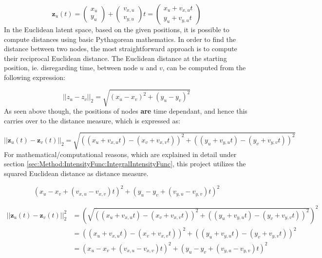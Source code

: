 \begin{equation}
    \textbf{z}_u(t) = \begin{pmatrix}
    x_u\\
    y_u
    \end{pmatrix}
    +
    \begin{pmatrix}
    v_{x,u}\\
    v_{y,u}
    \end{pmatrix}
    t
    = 
    \begin{pmatrix}
    x_u + v_{x,u}t\\
    y_u + v_{y,u}t
    \end{pmatrix}
\end{equation}
In the Euclidean latent space, based on the given positions, it is possible to compute distances using basic Pythagorean mathematics. 
In order to find the distance between two nodes, the most straightforward approach is to compute their reciprocal Euclidean distance.
The Euclidean distance at the starting position, ie. disregarding time, between node $u$ and $v$, can be computed from the following expression:

\begin{equation}
    ||z_u - z_v||_2
    = 
    \sqrt{(x_u - x_v)^2 + (y_u - y_v)^2}
\end{equation}
As seen above though, the positions of nodes \textbf{are} time dependant, and hence this carries over to the distance measure, which is expressed as:

\begin{equation}
    ||\textbf{z}_u(t) - \textbf{z}_v(t)||_2
    = 
    \sqrt{((x_u + v_{x,u}t) - (x_v + v_{x,v}t))^2 + ((y_u + v_{y,u}t) - (y_v + v_{y,v}t))^2}
\end{equation}
For mathematical/computational reasons, which are explained in detail under section \ref{sec:Method:IntensityFunc:IntegralIntensityFunc}, this project utilizes the squared Euclidean distance as distance measure.

\begin{equation}
    (x_u - x_v + (v_{x,u} - v_{x,v})t)^2 + (y_u - y_v + ( v_{y,u} - v_{y,v})t)^2
\end{equation}

\begin{align} 
||\textbf{z}_u(t) - \textbf{z}_v(t)||_2^2
&= 
\left(\sqrt{((x_u + v_{x,u}t) - (x_v + v_{x,v}t))^2 + ((y_u + v_{y,u}t) - (y_v + v_{y,v}t))^2}\right)^2
\\
&=
((x_u + v_{x,u}t) - (x_v + v_{x,v}t))^2 + ((y_u + v_{y,u}t) - (y_v + v_{y,v}t))^2
\\
&=
(x_u - x_v + (v_{x,u} - v_{x,v})t)^2 + (y_u - y_v + ( v_{y,u} - v_{y,v})t)^2
\label{eq:SquaredEuclideanDistance}
\end{align}



